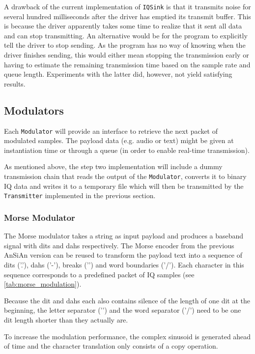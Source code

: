 A drawback of the current implementation of \texttt{IQSink} is that it transmits noise for several hundred milliseconds after the driver has emptied its transmit buffer. This is because the driver apparently takes some time to realize that it sent all data and can stop transmitting. An alternative would be for the program to explicitly tell the driver to stop sending. As the program has no way of knowing when the driver finishes sending, this would either mean stopping the transmission early or having to estimate the remaining transmission time based on the sample rate and queue length. Experiments with the latter did, however, not yield satisfying results.


\subsection{Modulators}

Each \texttt{Modulator} will provide an interface to retrieve the next packet of
modulated samples. The payload data (e.g. audio or text) might be given at
instantiation time or through a queue (in order to enable real-time transmission).

As mentioned above, the step two implementation will include a dummy transmission
chain that reads the output of the \texttt{Modulator}, converts it to binary IQ
data and writes it to a temporary file which will then be transmitted by the
\texttt{Transmitter} implemented in the previous section.


\subsubsection{Morse Modulator}

The Morse modulator takes a string as input payload and produces a baseband
signal with dits and dahs respectively. The Morse encoder from the previous
\ac{AnSiAn} version can be reused to transform the payload text into a
sequence of dits ('.'), dahs ('-'), breaks ('\textvisiblespace') and word
boundaries ('/'). Each character in this sequence corresponds to a predefined
packet of IQ samples (see \autoref{tab:morse_modulation}).

Because the dit and dahs each also contains silence of the length of one dit at
the beginning, the letter separator ('\textvisiblespace') and the word separator
('/') need to be one dit length shorter than they actually are.

To increase the modulation performance, the complex sinusoid is generated
ahead of time and the character translation only consists of a copy operation.

